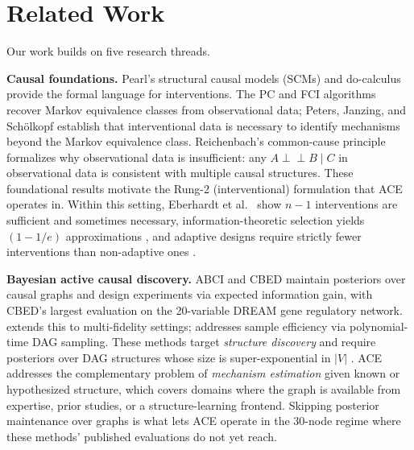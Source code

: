 \documentclass{article}
\theoremstyle{plain}
\theoremstyle{definition}
\theoremstyle{remark}
\begin{document}
\section{Related Work}
\label{sec:related}

Our work builds on five research threads.

\textbf{Causal foundations.} Pearl's structural causal models (SCMs) and do-calculus \citep{pearl2009causality,pearl1995causal} provide the formal language for interventions. The PC and FCI algorithms \citep{spirtes2000causation} recover Markov equivalence classes from observational data; Peters, Janzing, and Schölkopf \citep{peters2017elements} establish that interventional data is necessary to identify mechanisms beyond the Markov equivalence class. Reichenbach's common-cause principle \citep{reichenbach1956} formalizes why observational data is insufficient: any $A \perp\!\!\!\!\perp B \mid C$ in observational data is consistent with multiple causal structures. These foundational results motivate the Rung-2 (interventional) formulation that ACE operates in. Within this setting, Eberhardt et al.\ \citep{eberhardt2005number,eberhardt2006n} show $n-1$ interventions are sufficient and sometimes necessary, information-theoretic selection yields $(1-1/e)$ approximations \citep{shanmugam2015learning}, and adaptive designs require strictly fewer interventions than non-adaptive ones \citep{hauser2012characterization,cho2016reconstructing}.

\textbf{Bayesian active causal discovery.} ABCI \citep{toth2022active} and CBED \citep{tigas2022interventions} maintain posteriors over causal graphs and design experiments via expected information gain, with CBED's largest evaluation on the 20-variable DREAM gene regulatory network. \citet{zhang2023bayesian} extends this to multi-fidelity settings; \citet{zhou2024sample} addresses sample efficiency via polynomial-time DAG sampling. These methods target \emph{structure discovery} and require posteriors over DAG structures whose size is super-exponential in $|V|$ \citep{chickering1996learning}. ACE addresses the complementary problem of \emph{mechanism estimation} given known or hypothesized structure, which covers domains where the graph is available from expertise, prior studies, or a structure-learning frontend. Skipping posterior maintenance over graphs is what lets ACE operate in the 30-node regime where these methods' published evaluations do not yet reach.
\end{document}
